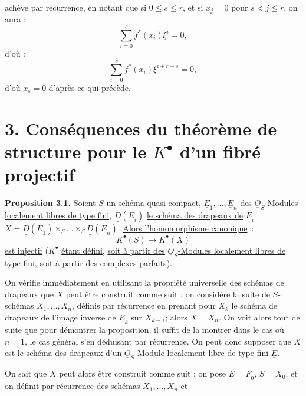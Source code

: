 
achève par
récurrence, en notant que si $0\leq s\leq r$, et si $x_j=0$ pour $s<j\leq r$, on aura :
\[
  \sum_{i=0}^{s}f^*(x_i)\xi^i=0,
\]
d'où :
\[
  \sum_{i=0}^{s}f^*(x_i)\xi^{i+r-s}=0,
\]
d'où $x_s=0$ d'après ce qui précède.

\section*{3. Conséquences du théorème de structure pour le \(K^{\bullet}\) d'un fibré projectif}

\textbf{Proposition 3.1.} \uline{Soient} \(S\) \uline{un schéma quasi}-\uline{compact}, \(\underline{E}_1,\ldots,\underline{E}_n\) \uline{des} \(\underline{O}_S\)\uline{-Modules localement libres de type fini}, \(\underline{\underline{D}}(\underline{E}_i)\) \uline{le schéma des drapeaux de} \(\underline{E}_i\) \(X=\underline{\underline{D}}(\underline{E}_1)\times_S\ldots\times_S \underline{\underline{D}}(\underline{E}_n)\).
\uline{Alors l'homomorphisme canonique}~:
\[
  K^{\bullet}(S)\longrightarrow K^{\bullet}(X)
\]
\uline{est injectif} (\(K^{\bullet}\) \uline{étant défini}, \uline{soit à partir des} \(\underline{O}_S\)\uline{-Modules localement libres de type fini}, \uline{soit à partir des complexes parfaits}).

On vérifie immédiatement en utilisant la propriété universelle des schémas de drapeaux que \(X\) peut être construit comme suit : on considère la suite de \(S\)-schémas \(X_1,\ldots,X_n\), définis par récurrence en prenant pour \(X_k\) le schéma de drapeaux de l'image inverse de \(\underline{E}_k\) sur \(X_{k-1}\); alors \(X=X_n\). On voit alors tout de suite que pour démontrer la proposition, il suffit de la montrer dans le cas où \(n=1\), le cas général s'en déduisant par récurrence. On peut donc supposer que \(X\) est le schéma des drapeaux d'un \(\underline{O}_S\)-Module localement libre de type fini \(\underline{E}\).

On sait que \(X\) peut alors être construit comme suit : on pose \(\underline{E}=\underline{F}_0\), \(S=X_0\), et on définit par récurrence des schémas \(X_1,\ldots,X_n\) et

